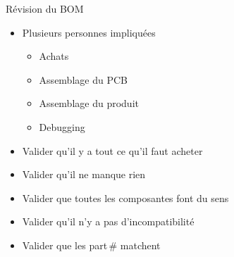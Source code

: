 \begin{frame}{Révision du BOM}
    \begin{itemize}
        \item Plusieurs personnes impliquées
        \begin{itemize}
            \item Achats
            \item Assemblage du PCB
            \item Assemblage du produit
            \item Debugging
        \end{itemize}
        \bigskip
        \item Valider qu'il y a tout ce qu'il faut acheter
        \item Valider qu'il ne manque rien
        \item Valider que toutes les composantes font du sens
        \item Valider qu'il n'y a pas d'incompatibilité
        \item Valider que les part\,\# matchent
    \end{itemize}
\end{frame}

